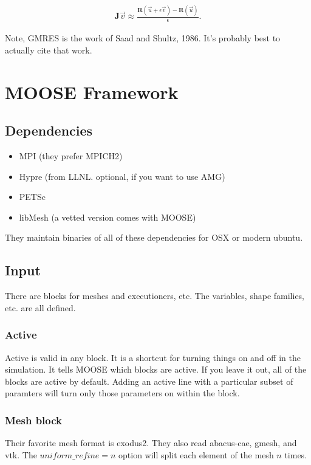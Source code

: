 \begin{align}
  \boldsymbol{J}\vec{v}\approx \frac{\boldsymbol{R}(\vec{u}+\epsilon\vec{v}) - 
  \boldsymbol{R}(\vec{u})}{\epsilon}.
  \label{diffapprox}
\end{align}

Note, GMRES is the work of Saad and Shultz, 1986. It's probably best to actually 
cite that work. 

\section{MOOSE Framework}

\subsection{Dependencies}
\begin{itemize}
  \item MPI (they prefer MPICH2)
  \item Hypre (from LLNL. optional, if you want to use AMG)
  \item PETSc
  \item libMesh (a vetted version comes with MOOSE)
\end{itemize}


They maintain binaries of all of these dependencies for OSX or modern ubuntu. 

\subsection{Input}

There are blocks for meshes and executioners, etc. The variables, shape 
families, etc. are all defined.

\subsubsection{Active}
Active is valid in any block. It is a shortcut for turning things on and off in 
the simulation. It tells MOOSE which blocks are active. If you leave it out, all 
of the blocks are active by default. Adding an active line with a particular 
subset of paramters will turn only those parameters on within the block.

\subsubsection{Mesh block}
Their favorite mesh format is exodus2. They also read abacus-cae, gmesh, and 
vtk. The $uniform\_refine=n$ option will split each element of the mesh $n$ 
times.

